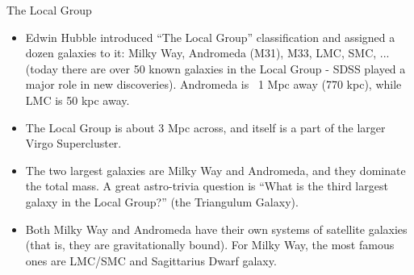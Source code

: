\documentclass[letterpaper,landscape]{slides}
\begin{document}
\begin{slide}
\begin{center}
{\large \color{red}  The Local Group }
\end{center}

\begin{itemize}
\item Edwin Hubble introduced ``The Local Group'' classification and assigned a dozen galaxies to
it: Milky Way, Andromeda (M31), M33, LMC, SMC, ... (today there are over 50 known galaxies 
in the Local Group - SDSS played a major role in new discoveries). Andromeda is ~1 Mpc
away (770 kpc), while LMC is 50 kpc away. 

\item The Local Group is about 3 Mpc across, and itself is a part of the larger Virgo Supercluster.

\item The two largest galaxies are Milky Way and Andromeda, and they dominate the total mass. 
A great astro-trivia question is ``What is the third largest galaxy in the Local Group?''  
(the Triangulum Galaxy).

\item Both Milky Way and Andromeda have their own systems of satellite galaxies (that is, they
are gravitationally bound). For Milky Way, the most famous ones are LMC/SMC and 
Sagittarius Dwarf galaxy. 

\end{itemize}  

\begin{center}
 {}     
\end{center}

\vfill
\end{slide}
\end{document}
